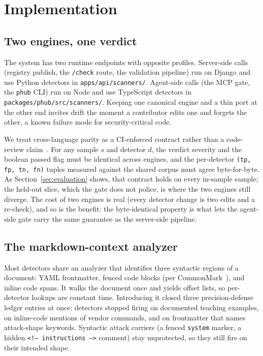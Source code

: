 
\section{Implementation}
\label{sec:implementation}

\subsection{Two engines, one verdict}

The system has two runtime endpoints with opposite profiles.
Server-side calls (registry publish, the \texttt{/check} route, the
validation pipeline) run on Django and use Python detectors in
\texttt{apps/api/scanners/}. Agent-side calls (the MCP gate, the
\texttt{phub} CLI) run on Node and use TypeScript detectors in
\texttt{packages/phub/src/scanners/}. Keeping one canonical engine and a
thin port at the other end invites drift the moment a contributor edits
one and forgets the other, a known failure mode for security-critical
code.

We treat cross-language parity as a CI-enforced contract rather than a
code-review claim~\cite{primitivehub:2026:adr-0023}. For any sample $s$
and detector $d$, the verdict severity and the boolean passed flag must
be identical across engines, and the per-detector
\texttt{(tp, fp, tn, fn)} tuples measured against the shared corpus must
agree byte-for-byte. As Section~\ref{sec:evaluation} shows, that
contract holds on every in-sample sample; the held-out slice, which the
gate does not police, is where the two engines still diverge. The cost
of two engines is real (every detector change is two edits and a
re-check), and so is the benefit: the byte-identical property is what
lets the agent-side gate carry the same guarantee as the server-side
pipeline.

\subsection{The markdown-context analyzer}

Most detectors share an analyzer that identifies three syntactic regions
of a document: YAML frontmatter, fenced code blocks (per
CommonMark~\cite{CommonMark:2024:spec}), and inline code spans. It walks
the document once and yields offset lists, so per-detector lookups are
constant time. Introducing it closed three precision-defense ledger
entries at once: detectors stopped firing on documented teaching
examples, on inline-code mentions of vendor commands, and on frontmatter
that names attack-shape keywords. Syntactic attack carriers (a fenced
\texttt{system} marker, a hidden \texttt{<!-- instructions -->} comment)
stay unprotected, so they still fire on their intended shape.

